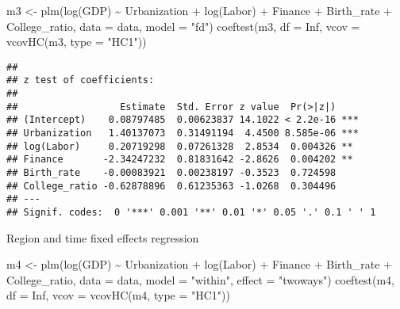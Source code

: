 \documentclass[
]{article}
\newenvironment{Shaded}{\begin{snugshade}}{\end{snugshade}}
\newcommand{\AttributeTok}[1]{\textcolor[rgb]{0.77,0.63,0.00}{#1}}
\newcommand{\ConstantTok}[1]{\textcolor[rgb]{0.00,0.00,0.00}{#1}}
\newcommand{\FunctionTok}[1]{\textcolor[rgb]{0.00,0.00,0.00}{#1}}
\newcommand{\NormalTok}[1]{#1}
\newcommand{\OtherTok}[1]{\textcolor[rgb]{0.56,0.35,0.01}{#1}}
\newcommand{\SpecialCharTok}[1]{\textcolor[rgb]{0.00,0.00,0.00}{#1}}
\newcommand{\StringTok}[1]{\textcolor[rgb]{0.31,0.60,0.02}{#1}}
\begin{document}
\begin{Shaded}
\begin{Highlighting}[]
\NormalTok{m3 }\OtherTok{\textless{}{-}} \FunctionTok{plm}\NormalTok{(}\FunctionTok{log}\NormalTok{(GDP) }\SpecialCharTok{\textasciitilde{}}\NormalTok{ Urbanization }\SpecialCharTok{+} \FunctionTok{log}\NormalTok{(Labor) }\SpecialCharTok{+}\NormalTok{ Finance }\SpecialCharTok{+}\NormalTok{ Birth\_rate }\SpecialCharTok{+}\NormalTok{ College\_ratio, }
          \AttributeTok{data =}\NormalTok{ data, }\AttributeTok{model =} \StringTok{"fd"}\NormalTok{)}
\FunctionTok{coeftest}\NormalTok{(m3, }\AttributeTok{df =} \ConstantTok{Inf}\NormalTok{, }\AttributeTok{vcov =} \FunctionTok{vcovHC}\NormalTok{(m3, }\AttributeTok{type =} \StringTok{"HC1"}\NormalTok{))}
\end{Highlighting}
\end{Shaded}

\begin{verbatim}
## 
## z test of coefficients:
## 
##                  Estimate  Std. Error z value  Pr(>|z|)    
## (Intercept)    0.08797485  0.00623837 14.1022 < 2.2e-16 ***
## Urbanization   1.40137073  0.31491194  4.4500 8.585e-06 ***
## log(Labor)     0.20719298  0.07261328  2.8534  0.004326 ** 
## Finance       -2.34247232  0.81831642 -2.8626  0.004202 ** 
## Birth_rate    -0.00083921  0.00238197 -0.3523  0.724598    
## College_ratio -0.62878896  0.61235363 -1.0268  0.304496    
## ---
## Signif. codes:  0 '***' 0.001 '**' 0.01 '*' 0.05 '.' 0.1 ' ' 1
\end{verbatim}

\newpage

Region and time fixed effects regression

\begin{Shaded}
\begin{Highlighting}[]
\NormalTok{m4 }\OtherTok{\textless{}{-}} \FunctionTok{plm}\NormalTok{(}\FunctionTok{log}\NormalTok{(GDP) }\SpecialCharTok{\textasciitilde{}}\NormalTok{ Urbanization }\SpecialCharTok{+} \FunctionTok{log}\NormalTok{(Labor) }\SpecialCharTok{+}\NormalTok{ Finance }\SpecialCharTok{+}\NormalTok{ Birth\_rate }\SpecialCharTok{+}\NormalTok{ College\_ratio, }
          \AttributeTok{data =}\NormalTok{ data, }\AttributeTok{model =} \StringTok{"within"}\NormalTok{, }\AttributeTok{effect =} \StringTok{"twoways"}\NormalTok{)}
\FunctionTok{coeftest}\NormalTok{(m4, }\AttributeTok{df =} \ConstantTok{Inf}\NormalTok{, }\AttributeTok{vcov =} \FunctionTok{vcovHC}\NormalTok{(m4, }\AttributeTok{type =} \StringTok{"HC1"}\NormalTok{))}
\end{Highlighting}
\end{Shaded}
\end{document}
